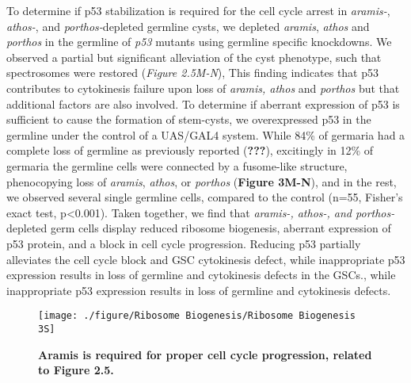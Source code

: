 \documentclass[12pt,oneside]{reedthesis}
\begin{document}
To determine if p53 stabilization is required for the cell cycle arrest in \emph{aramis-}, \emph{athos-}, and \emph{porthos-}depleted germline cysts, we depleted \emph{aramis}, \emph{athos} and \emph{porthos} in the germline of \emph{p53} mutants using germline specific knockdowns. We observed a partial but significant alleviation of the cyst phenotype, such that spectrosomes were restored (\emph{Figure 2.5M-N}), This finding indicates that p53 contributes to cytokinesis failure upon loss of \emph{aramis, athos} and \emph{porthos} but that additional factors are also involved. To determine if aberrant expression of p53 is sufficient to cause the formation of stem-cysts, we overexpressed p53 in the germline under the control of a UAS/GAL4 system. While 84\% of germaria had a complete loss of germline as previously reported ({\textbf{???}}), excitingly in 12\% of germaria the germline cells were connected by a fusome-like structure, phenocopying loss of \emph{aramis}, \emph{athos}, or \emph{porthos} (\textbf{Figure 3M-N}), and in the rest, we observed several single germline cells, compared to the control (n=55, Fisher's exact test, p\textless0.001). Taken together, we find that \emph{aramis-, athos-, and porthos-} depleted germ cells display reduced ribosome biogenesis, aberrant expression of p53 protein, and a block in cell cycle progression. Reducing p53 partially alleviates the cell cycle block and GSC cytokinesis defect, while inappropriate p53 expression results in loss of germline and cytokinesis defects in the GSCs., while inappropriate p53 expression results in loss of germline and cytokinesis defects.
\begin{figure}

{\centering \texttt{[image: ./figure/Ribosome Biogenesis/Ribosome Biogenesis 3S]} 

}

\caption[\textbf{Aramis is required for proper cell cycle progression, related to Figure 2.5.}]{\textbf{Aramis is required for proper cell cycle progression, related to Figure 2.5.}}\label{fig:unnamed-chunk-11}
\end{figure}
\end{document}
